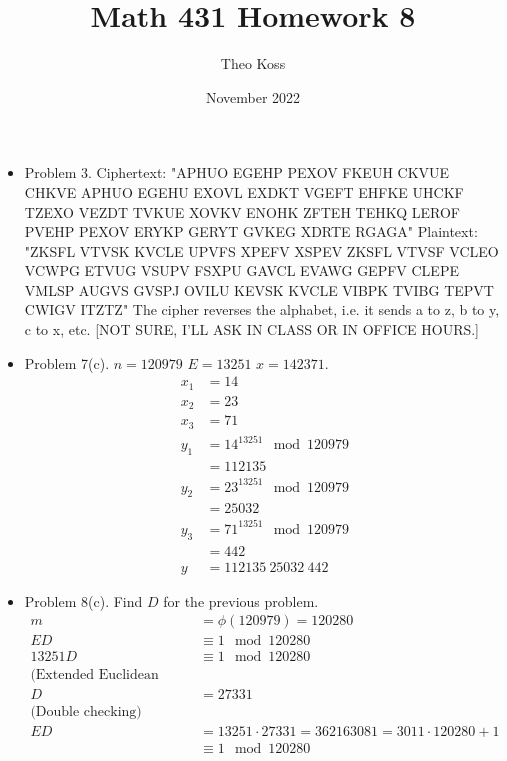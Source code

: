 \documentclass[a4paper,12pt]{extarticle}
\title{Math 431 Homework 8}
\author{Theo Koss}
\date{November 2022}
\theoremstyle{definition}
\begin{document}
\begin{itemize}
    \item Problem 3. Ciphertext: "APHUO EGEHP PEXOV FKEUH CKVUE CHKVE APHUO
EGEHU EXOVL EXDKT VGEFT EHFKE UHCKF TZEXO
VEZDT TVKUE XOVKV ENOHK ZFTEH TEHKQ LEROF
PVEHP PEXOV ERYKP GERYT GVKEG XDRTE RGAGA" \myskip Plaintext: "ZKSFL VTVSK KVCLE UPVFS XPEFV XSPEV ZKSFL
VTVSF VCLEO VCWPG ETVUG VSUPV FSXPU GAVCL
EVAWG GEPFV CLEPE VMLSP AUGVS GVSPJ OVILU
KEVSK KVCLE VIBPK TVIBG TEPVT CWIGV ITZTZ" \myskip The cipher reverses the alphabet, i.e. it sends a to z, b to y, c to x, etc. [NOT SURE, I'LL ASK IN CLASS OR IN OFFICE HOURS.]
    \item Problem 7(c). $n=120979$ $E=13251$ $x=142371$.\begin{align*}
        x_1&=14\\
        x_2&=23\\
        x_3&=71\\
        y_1&=14^{13251}\mod{120979}\\
        &=112135\\
        y_2&=23^{13251}\mod{120979}\\
        &=25032\\
        y_3&=71^{13251}\mod{120979}\\
        &=442\\
        y&=112135\ 25032\ 442
    \end{align*}
    \newpage \item Problem 8(c). Find $D$ for the previous problem.\begin{align*}
        m&=\phi(120979)=120280\\
        ED&\equiv1\mod{120280}\\
        13251D&\equiv1\mod{120280}\\
        \text{(Extended Euclidean Alg.)}\\
        D&=27331\\
        \text{(Double checking)}\\
        ED&=13251\cdot27331=362163081=3011\cdot120280+1\\
        &\equiv1\mod{120280}
    \end{align*}
\end{itemize}
\end{document}
